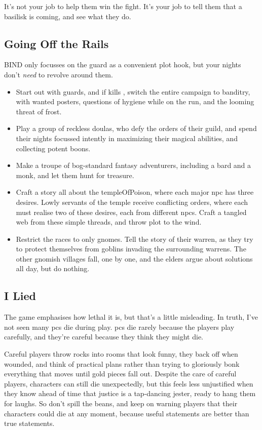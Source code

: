 \begin{multicols}{2}
It's not your job to help them win the fight.
It's your job to tell them that a basilisk is coming, and see what they do.

\subsection{Going Off the Rails}

BIND only focusses on the \gls{guard} as a convenient plot hook, but your nights don't \emph{need} to revolve around them.

\begin{itemize}
  \item
  Start out with \glspl{guard}, and if  kills , switch the entire \gls{campaign} to banditry, with wanted posters, questions of hygiene while on the run, and the looming threat of frost.
  \item
  Play a group of reckless \glspl{doula}, who defy the orders of their guild, and spend their nights focussed intently in maximizing their magical abilities, and collecting potent \glspl{boon}.
  \item
  Make a troupe of bog-standard fantasy adventurers, including a bard and a monk, and let them hunt for treasure.
  \item
  Craft a story all about the \gls{templeOfPoison}, where each major \gls{npc} has three desires.
  Lowly servants of the temple receive conflicting orders, where each must realise two of these desires, each from different \glspl{npc}.
  Craft a tangled web from these simple threads, and throw plot to the wind.
  \item
  Restrict the races to only gnomes.
  Tell the story of their warren, as they try to protect themselves from goblins invading the surrounding warrens.
  The other gnomish villages fall, one by one, and the elders argue about solutions all day, but do nothing.
\end{itemize}

\subsection{I Lied}

The game emphasises how lethal it is, but that's a little misleading.
In truth, I've not seen many \glspl{pc} die during play.
\Glspl{pc} die rarely because the players play carefully, and they're careful because they think they might die.

Careful players throw rocks into rooms that look funny, they back off when wounded, and think of practical plans rather than trying to gloriously bonk everything that moves until gold pieces fall out.
Despite the care of careful players, characters can still die unexpectedly, but this feels less unjustified when they know ahead of time that justice is a tap-dancing jester, ready to hang them for laughs.
So don't spill the beans, and keep on warning players that their characters could die at any moment, because useful statements are better than true statements.


\end{multicols}
